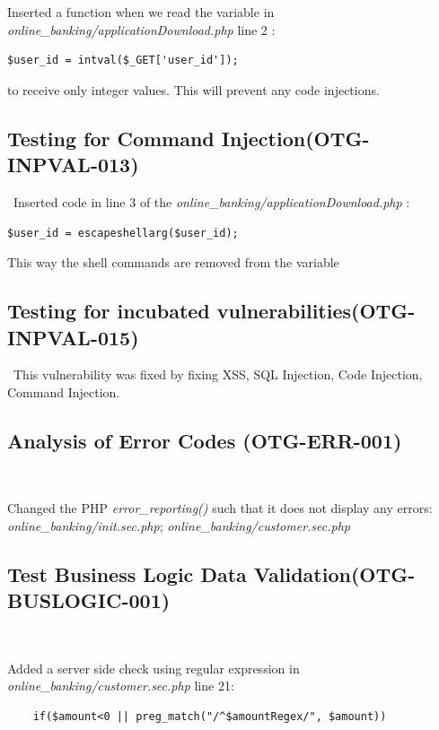 \documentclass[headsepline,footsepline,footinclude=false,oneside,fontsize=11pt,paper=a4,listof=totoc,bibliography=totoc]{scrbook} %
\begin{document}
Inserted a function when we read the variable in \textit{online\_banking/applicationDownload.php} line 2 :  

\begin{lstlisting} 
$user_id = intval($_GET['user_id']);
\end{lstlisting} 
to receive only integer values.
This will prevent any code injections.\\

\subsection{Testing for Command Injection(OTG-INPVAL-013)}\
Inserted code in line 3 of the \textit{online\_banking/applicationDownload.php} : 

\begin{lstlisting} 
$user_id = escapeshellarg($user_id);
\end{lstlisting}

 This way the shell commands are removed from the variable\\
 

\subsection{Testing for incubated vulnerabilities(OTG-INPVAL-015)}\
This vulnerability was fixed by fixing XSS, SQL Injection, Code Injection, Command Injection.
 
 
\subsection{Analysis of Error Codes (OTG-ERR-001)}\

Changed the PHP \textit{error\_reporting()} such that it does not display any errors: \textit{online\_banking/init.sec.php}; \textit{online\_banking/customer.sec.php}\\

\pagebreak
\subsection{Test Business Logic Data Validation(OTG-BUSLOGIC-001)}\

Added a server side check using regular expression in \textit{online\_banking/customer.sec.php} line 21: 
	\begin{lstlisting} 
	if($amount<0 || preg_match("/^$amountRegex/", $amount)) 
	\end{lstlisting}
	
\end{document}
